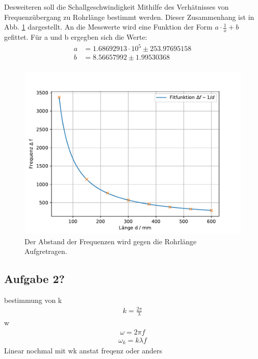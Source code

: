\FloatBarrier
Desweiteren soll die Schallgeschwindigkeit Mithilfe des Verhätnisses von Frequenzübergang zu Rohrlänge bestimmt werden.
Dieser Zusammenhang ist in Abb. \ref{fig.1/x} dargestellt.
An die Messwerte wird eine Funktion der Form $a\cdot\frac{1}{x}+b$ gefittet.
Für a und b ergegben sich die Werte:
\begin{align*}
  a&=1.68692913\cdot10^5\pm253.97695158\\
  b&=8.56657992\pm1.99530368\\
\end{align*}
\begin{figure}[h!]
  \centering
  \includegraphics[width=\textwidth]{geschi.pdf}
  \caption{Der Abstand der Frequenzen wird gegen die Rohrlänge Aufgretragen.}
  \label{fig.1/x}
\end{figure}

\subsection{Aufgabe 2?}
bestimmung von k
\begin{align*}
  k= \frac{2\pi}{\lambda}
\end{align*}
w
\begin{align*}
  \omega=2\pi f
\end{align*}
\begin{align*}
  \omega_k=k\lambda f
\end{align*}
Linear nochmal mit wk anstat freqenz oder anders
